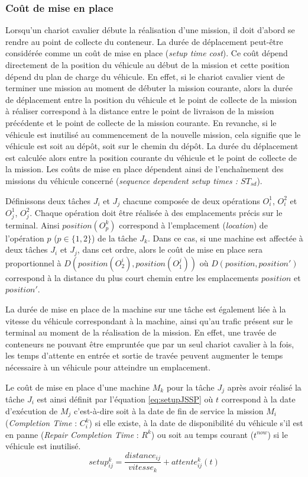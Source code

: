 \subsubsection{Coût de mise en place}

Lorsqu'un chariot cavalier débute la réalisation d'une mission, il doit d'abord se rendre au point de collecte du conteneur. La durée de déplacement peut-être considérée comme un coût de mise en place (\textit{setup time cost}). Ce coût dépend directement de la position du véhicule au début de la mission et cette position dépend du plan de charge du véhicule. En effet, si le chariot cavalier vient de terminer une mission au moment de débuter la mission courante, alors la durée de déplacement entre la position du véhicule et le point de collecte de la mission à réaliser correspond à la distance entre le point de livraison de la mission précédente et le point de collecte de la mission courante. En revanche, si le véhicule est inutilisé au commencement de la nouvelle mission, cela signifie que le véhicule est soit au dépôt, soit sur le chemin du dépôt. La durée du déplacement est calculée alors entre la position courante du véhicule et le point de collecte de la mission. Les coûts de mise en place dépendent 
ainsi de l'enchaînement des missions du véhicule concerné (\textit{sequence dependent setup times : $ST_{sd}$}).

Définissons deux tâches $J_i$ et $J_j$ chacune composée de deux opérations $O_i^1$, $O_i^2$ et $O_j^1$, $O_j^2$. Chaque opération doit être réalisée à des emplacements précis sur le terminal. Ainsi $position(O^k_p)$ correspond à l'emplacement (\textit{location}) de  l'opération $p$ ($p \in \{1,2\}$) de la tâche $J_k$. Dans ce cas, si une machine est affectée à deux tâches $J_i$ et $J_j$, dans cet ordre, alors le coût de mise en place sera proportionnel à $D(position(O_2^i),position(O_1^j))$ où $D(position,position')$ correspond à la distance du plus court chemin entre les emplacements $position$ et $position'$.

La durée de mise en place de la machine sur une tâche est également liée à la vitesse du véhicule correspondant à la machine, ainsi qu'au trafic présent sur le terminal au moment de la réalisation de la mission. En effet, une travée de conteneurs ne pouvant être empruntée que par un seul chariot cavalier à la fois, les temps d'attente en entrée et sortie de travée peuvent augmenter le temps nécessaire à un véhicule pour atteindre un emplacement.

Le coût de mise en place d'une machine $M_k$ pour la tâche $J_j$ après avoir réalisé la tâche $J_i$ est ainsi définit par l'équation \ref{eq:setupJSSP} où $t$ correspond à la date d'exécution de $M_j$ c'est-à-dire soit à la date de fin de service la mission $M_i$ (\textit{Completion Time} : $C^k_i$) si elle existe, à la date de disponibilité du véhicule s'il est en panne (\textit{Repair Completion Time} : $R^k$) ou soit au temps courant ($t^{now}$) si le véhicule est inutilisé.
\begin{equation}
 \label{eq:setupJSSP}
  setup^{k}_{ij} = \frac{distance_{ij}}{vitesse_k} + attente_{ij}^k(t)
\end{equation}

